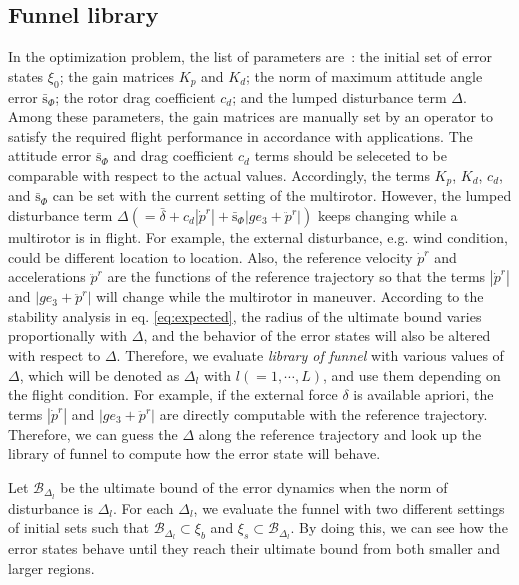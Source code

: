 \documentclass[letterpaper, 10 pt, conference]{ieeeconf}  %
\begin{document}
\subsection{Funnel library}
In the optimization problem, the list of parameters are~: the initial set of error states $\xi_0$; 
the gain matrices $K_p$ and $K_d$; 
the norm of maximum attitude angle error $\bar{\text{s}}_\Phi$;
the rotor drag coefficient $c_d$; and the lumped disturbance term $\Delta$. 
Among these parameters, the gain matrices are manually set by an operator to satisfy the required flight performance in accordance with applications. 
The attitude error $\bar{\text{s}}_\Phi$ and drag coefficient $c_d$ terms should be seleceted to be comparable with respect to the actual values.
Accordingly, the terms $K_p$, $K_d$, $c_d$, and $\bar{\text{s}}_\Phi$ can be set with the current setting of the multirotor.
However, the lumped disturbance term $\Delta(=\bar{\delta}+c_d|\dot{p}^r|+\bar{\text{s}}_\Phi|ge_3 + \ddot{p}^r|)$ keeps changing while a multirotor is in flight. 
For example, the external disturbance, e.g. wind condition, could be different location to location.
Also, the reference velocity $\dot{p}^r$ and accelerations $\ddot{p}^r$ are the functions of the reference trajectory so that the terms $|\dot{p}^r|$ and $|ge_3+\ddot{p}^r|$ will change while the multirotor in maneuver.
According to the stability analysis in eq. \eqref{eq:expected}, 
the radius of the ultimate bound varies proportionally with $\Delta$, 
and the behavior of the error states will also be altered with respect to $\Delta$. 
Therefore, we evaluate \textit{library of funnel} with various values of $\Delta$, which will be denoted as $\Delta_l$ with $l(=1,\cdots,L)$, and use them depending on the flight condition.
For example, if the external force $\delta$ is available apriori, 
the terms $|\dot{p}^r|$ and $|ge_3 + \ddot{p}^r|$ are directly computable with the reference trajectory. 
Therefore, we can guess the $\Delta$ along the reference trajectory and look up the library of funnel to compute how the error state will behave.

Let $\mathcal{B}_{\Delta_l}$ be the ultimate bound of the error dynamics when the norm of disturbance is $\Delta_l$.
For each $\Delta_l$, we evaluate the funnel with two different settings of initial sets such that $\mathcal{B}_{\Delta_l}\subset\xi_b$ and $\xi_s\subset\mathcal{B}_{\Delta_l}$.
By doing this, we can see how the error states behave until they reach their ultimate bound from both smaller and larger regions.
\end{document}
